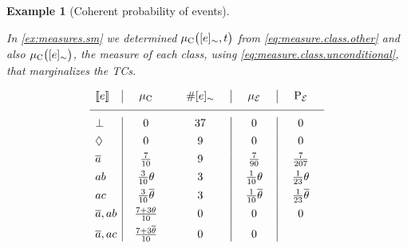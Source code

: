 \documentclass{tlp}
\newtheorem{example}{Example}
\newcommand{\at}[1]{\ensuremath{\!\del{#1}}}        %
\newcommand{\cla}[1]{\ensuremath{{\cal #1}}}        %
\newcommand{\co}[1]{\ensuremath{\overline{#1}}}     %
\newcommand{\EVENTSset}{\ensuremath{\cla{E}}}
\newcommand{\prfunc}{\ensuremath{\mathrm{P}}}
\newcommand{\prd}[1]{\ensuremath{\prfunc_{#1}}}
\newcommand{\prE}{\prd{\EVENTSset}}
\newcommand{\pwC}{\ensuremath{\mu_{\textrm{C}}}}
\newcommand{\pwc}[1]{\ensuremath{\pwC\at{#1}}}
\newcommand{\pwE}{\ensuremath{\mu_{\EVENTSset}}}
\newcommand{\stablecore}[1]{\ensuremath{\left\llbracket #1 \right\rrbracket}}
\newcommand{\inconsistent}{\bot}
\newcommand{\indepclass}{\ensuremath{\Diamond}}
\newcommand{\class}[1]{\ensuremath{[{#1}]_{\sim}}}
\newcommand{\franc}[1]{{\color{green!30!black}#1}}
\begin{document}
\franc{
\begin{example}[Coherent probability of events]\label{ex:choerent.probability}\em
    
  In \cref{ex:measures.sm} we determined \(\pwc{\class{e}, t}\) from
  \cref{eq:measure.class.other} and also \(\pwc{\class{e}}\), the
  measure of each class, using \cref{eq:measure.class.unconditional},
  that marginalizes the \aclp{TC}.

    \begin{equation*}
        \begin{array}{l|cc|c|c}
            \stablecore{e}
                & \hspace{1em}\pwC\hspace{1em}
                & \hspace{1em}\#\class{e}\hspace{1em}
                & \hspace{1em}\pwE\hspace{1em}
                & \hspace{1em}\prE\hspace{1em}
            \\
            \hline
            \inconsistent
                & 0
                & 37
                & 0
                & 0                           
            \\[4pt]
            \indepclass
                & 0
                & 9
                & 0
                & 0                           
            \\[4pt]
            \co{a}
                & \frac{7}{10}
                & 9
                & \frac{7}{90}
                & \frac{7}{207}
            \\[4pt]
            ab
                & \frac{3}{10}\theta
                & 3
                & \frac{1}{10}\theta
                & \frac{1}{23}\theta
            \\[4pt]
            ac
                & \frac{3}{10}\co{\theta}
                & 3
                & \frac{1}{10}\co{\theta}
                & \frac{1}{23}\co{\theta}
            \\[4pt]
            \co{a}, ab
                & \frac{7 + 3\theta}{10}
                & 0
                & 0
                & 0
            \\[4pt]
            \co{a}, ac
                & \frac{7 + 3\co{\theta}}{10}
                & 0
                & 0

\end{array}
\end{equation*}
\end{example}}
\end{document}
